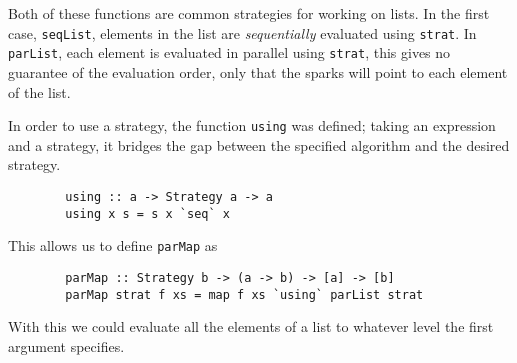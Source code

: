Both of these functions are common strategies for working on lists. In the first
case, \verb=seqList=, elements in the list are \emph{sequentially} evaluated
using \verb=strat=. In \verb=parList=, each element is evaluated in parallel
using \verb=strat=, this gives no guarantee of the evaluation order, only that
the sparks will point to each element of the list.

In order to use a strategy, the function \verb=using= was defined; taking an
expression and a strategy, it bridges the gap between the specified algorithm
and the desired strategy.

\begin{verbatim}
        using :: a -> Strategy a -> a
        using x s = s x `seq` x
\end{verbatim}

This allows us to define \verb=parMap= as

\begin{verbatim}
        parMap :: Strategy b -> (a -> b) -> [a] -> [b]
        parMap strat f xs = map f xs `using` parList strat
\end{verbatim}

With this we could evaluate all the elements of a list to whatever level the
first argument specifies.

